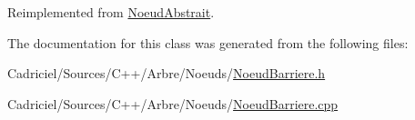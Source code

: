 Reimplemented from \hyperlink{group__inf2990_gadc6ebe69894dbb682fdd0ecb1b6c11e9}{Noeud\-Abstrait}.



The documentation for this class was generated from the following files\-:\begin{DoxyCompactItemize}
\item 
Cadriciel/\-Sources/\-C++/\-Arbre/\-Noeuds/\hyperlink{_noeud_barriere_8h}{Noeud\-Barriere.\-h}\item 
Cadriciel/\-Sources/\-C++/\-Arbre/\-Noeuds/\hyperlink{_noeud_barriere_8cpp}{Noeud\-Barriere.\-cpp}\end{DoxyCompactItemize}
